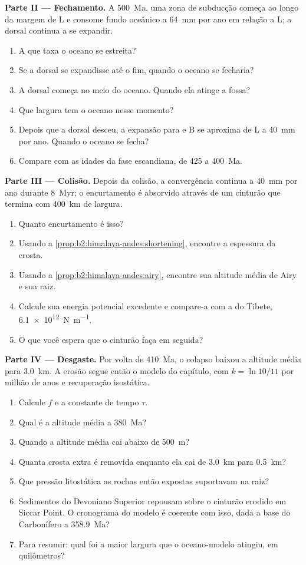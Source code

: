 \begin{problem}
\noindent\textbf{Parte II --- Fechamento.} A \qty{500}{Ma}, uma zona de subducção começa ao longo da
margem de L e consome fundo oceânico a \qty{64}{mm} por ano em relação a L; a dorsal continua
a se expandir.
\begin{enumerate}[resume]
\item A que taxa o oceano se estreita?
\item Se a dorsal se expandisse até o fim, quando o oceano se fecharia?
\item A dorsal começa no meio do oceano. Quando ela atinge a fossa?
\item Que largura tem o oceano nesse momento?
\item Depois que a dorsal desceu, a expansão para e B se aproxima de L a \qty{40}{mm} por
ano. Quando o oceano se fecha?
\item Compare com as idades da fase escandiana, de 425 a \qty{400}{Ma}.
\end{enumerate}

\noindent\textbf{Parte III --- Colisão.} Depois da colisão, a convergência continua a
\qty{40}{mm} por ano durante \qty{8}{Myr}; o encurtamento é absorvido através de um cinturão que termina com
\qty{400}{km} de largura.
\begin{enumerate}[resume]
\item Quanto encurtamento é isso?
\item Usando a \cref{prop:b2:himalaya-andes:shortening}, encontre a espessura da crosta.
\item Usando a \cref{prop:b2:himalaya-andes:airy}, encontre sua altitude média de Airy e sua raiz.
\item Calcule sua energia potencial excedente e compare-a com a do Tibete,
\qty{6.1e12}{N.m^{-1}}.
\item O que você espera que o cinturão faça em seguida?
\end{enumerate}

\noindent\textbf{Parte IV --- Desgaste.} Por volta de \qty{410}{Ma}, o colapso baixou a altitude
média para \qty{3.0}{km}. A erosão segue então o modelo do capítulo, com $k = \ln
10/11$ por milhão de anos e recuperação isostática.
\begin{enumerate}[resume]
\item Calcule $f$ e a constante de tempo $\tau$.
\item Qual é a altitude média a \qty{380}{Ma}?
\item Quando a altitude média cai abaixo de \qty{500}{m}?
\item Quanta crosta extra é removida enquanto ela cai de \qty{3.0}{km} para \qty{0.5}{km}?
\item Que pressão litostática as rochas então expostas suportavam na raiz?
\item Sedimentos do Devoniano Superior repousam sobre o cinturão erodido em Siccar Point. O cronograma do modelo é
coerente com isso, dada a base do Carbonífero a \qty{358.9}{Ma}?
\item Para resumir: qual foi a maior largura que o oceano-modelo atingiu, em quilômetros?
\end{enumerate}
\end{problem}
